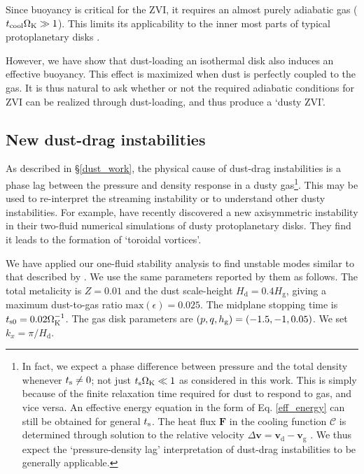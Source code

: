 Since buoyancy is critical for the ZVI, it requires an almost
purely adiabatic gas ($t_\mathrm{cool}\Omega_{\rm K}\gg 1$). This limits its
applicability to the inner most parts of typical protoplanetary disks
\citep{lesur16}. 

However, we have show that dust-loading an isothermal disk also
induces an effective buoyancy. This effect is maximized when dust is
perfectly coupled to the gas. It is thus natural to ask whether or not
the required adiabatic conditions for ZVI can be realized through
dust-loading, and thus produce a `dusty ZVI'. 


\subsection{New dust-drag
  instabilities}\label{dust_as_thermo} 


As described in \S\ref{dust_work}, 
the physical cause of dust-drag instabilities is a phase lag between
the pressure and density response in a dusty gas\footnote{
In fact, we expect a phase difference between pressure and the total
density  whenever $t_\mathrm{s}\neq0$; not just $t_\mathrm{s}\Omega_{\rm K}\ll 1$ as 
considered in this work. This is simply because of the finite
relaxation time required for dust to respond to gas, and vice versa. 
An effective energy equation in the form of Eq. \ref{eff_energy} can
still be obtained for general $t_\mathrm{s}$. The
heat flux $\bm{F}$ in the cooling function $\mathcal{C}$ is determined
through solution to the relative velocity $\Delta \bm{v} =
\bm{v}_\mathrm{d}-\bm{v}_\mathrm{g}$ \citep{youdin05a,laibe14}.  We
thus expect the `pressure-density lag' interpretation of dust-drag 
instabilities to be generally applicable.}. 
This may be used to re-interpret the streaming instability or to
understand other dusty instabilities. For example,
\cite{loren15,loren16} have recently discovered a new axisymmetric 
instability in their two-fluid numerical simulations of dusty
protoplanetary disks. They find it leads to the formation of
`toroidal vortices'. 

We have applied our one-fluid stability analysis to find unstable modes  
similar to that described by \cite{loren15}. We use the same
parameters reported by them as follows. 
The total metalicity is $Z=0.01$ and the dust scale-height $H_\mathrm{d} =
0.4H_\mathrm{g}$, giving a maximum dust-to-gas ratio
$\mathrm{max}(\epsilon) = 0.025$. The midplane stopping time is 
$t_\mathrm{s0}=0.02\Omega_{\rm K}^{-1}$. The gas disk parameters are $(p,q,
h_\mathrm{g}) =(-1.5, -1,0.05)$.  We set $k_x = \pi/H_\mathrm{d}$.      


